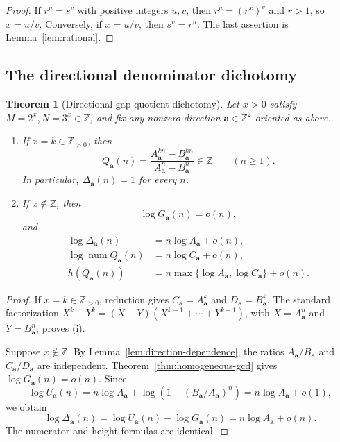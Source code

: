 \documentclass[11pt,oneside]{article}
\newtheorem{theorem}{Theorem}[section]
\theoremstyle{definition}
\theoremstyle{remark}
\newcommand{\Z}{\mathbb Z}
\newcommand{\num}{\operatorname{num}}
\begin{document}
\begin{proof}
If $r^u=s^v$ with positive integers $u,v$, then
$r^u=(r^x)^v$ and $r>1$, so $x=u/v$.  Conversely, if $x=u/v$, then $s^v=r^u$.
The last assertion is Lemma~\ref{lem:rational}.
\end{proof}

\subsection{The directional denominator dichotomy}

\begin{theorem}[Directional gap-quotient dichotomy]
\label{thm:directional-dichotomy}
Let $x>0$ satisfy $M=2^x,N=3^x\in\Z$, and fix any nonzero direction
$\mathbf a\in\Z^2$ oriented as above.
\begin{enumerate}[label=\textup{(\roman*)}]
\item If $x=k\in\Z_{>0}$, then
\[
 Q_{\mathbf a}(n)
 =\frac{A_{\mathbf a}^{kn}-B_{\mathbf a}^{kn}}
 {A_{\mathbf a}^{n}-B_{\mathbf a}^{n}}
 \in\Z
 \qquad(n\ge1).
\]
In particular, $\Delta_{\mathbf a}(n)=1$ for every $n$.
\item If $x\notin\Z$, then
\[
 \log G_{\mathbf a}(n)=o(n),
\]
and
\begin{align*}
 \log \Delta_{\mathbf a}(n)&=n\log A_{\mathbf a}+o(n),\\
 \log \num Q_{\mathbf a}(n)&=n\log C_{\mathbf a}+o(n),\\
 h(Q_{\mathbf a}(n))&=
 n\max\{\log A_{\mathbf a},\log C_{\mathbf a}\}+o(n).
\end{align*}
\end{enumerate}
\end{theorem}

\begin{proof}
If $x=k\in\Z_{>0}$, reduction gives
$C_{\mathbf a}=A_{\mathbf a}^k$ and
$D_{\mathbf a}=B_{\mathbf a}^k$.  The standard factorization
$X^k-Y^k=(X-Y)(X^{k-1}+\cdots+Y^{k-1})$, with
$X=A_{\mathbf a}^{n}$ and $Y=B_{\mathbf a}^{n}$, proves (i).

Suppose $x\notin\Z$.  By Lemma~\ref{lem:direction-dependence}, the ratios
$A_{\mathbf a}/B_{\mathbf a}$ and $C_{\mathbf a}/D_{\mathbf a}$ are independent.
Theorem~\ref{thm:homogeneous-gcd} gives $\log G_{\mathbf a}(n)=o(n)$.  Since
\[
 \log U_{\mathbf a}(n)
 =n\log A_{\mathbf a}
 +\log\left(1-(B_{\mathbf a}/A_{\mathbf a})^n\right)
 =n\log A_{\mathbf a}+o(1),
\]
we obtain
\[
 \log\Delta_{\mathbf a}(n)
 =\log U_{\mathbf a}(n)-\log G_{\mathbf a}(n)
 =n\log A_{\mathbf a}+o(n).
\]
The numerator and height formulas are identical.
\end{proof}
\end{document}
